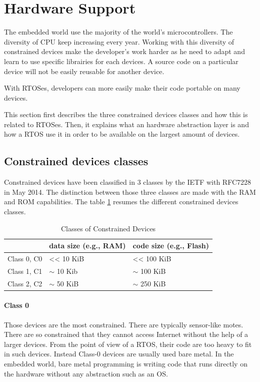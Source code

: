 \section{Hardware Support}

The embedded world use the majority of the world's microcontrollers.
The diversity of CPU keep increasing every year.
Working with this diversity of constrained devices make the developer's work harder as he need to adapt and learn to use specific librairies for each devices.
A source code on a particular device will not be easily reusable for another device.

With RTOSes, developers can more easily make their code portable on many devices.

This section first describes the three constrained devices classes and how this is related to RTOSes.
Then, it explains what an hardware abstraction layer is and how a RTOS use it in order to be available on the largest amount of devices.

\subsection{Constrained devices classes}

Constrained devices have been classified in 3 classes by the IETF with RFC7228 in May 2014. The distinction between those three classes are made with the RAM and ROM capabilities.
The table \ref{tab:constrained-devices-classes} resumes the different constrained devices classes.

\begin{table}[!h]
  \centering
  \begin{tabular}{|l|l|l|}
  \hline
   & data size (e.g., RAM) & code size (e.g., Flash) \\ \hline
  Class 0, C0 & \textless{}\textless{} 10 KiB & \textless{}\textless{} 100 KiB \\ %
  Class 1, C1 & $\sim$ 10 Kib & $\sim$ 100 KiB \\ %
  Class 2, C2 & $\sim$ 50 KiB & $\sim$ 250 KiB \\ \hline
  \end{tabular}
  \caption{Classes of Constrained Devices}
  \label{tab:constrained-devices-classes}
\end{table}

\paragraph{Class 0}
Those devices are the most constrained.
There are typically sensor-like motes.
There are so constrained that they cannot access Internet without the help of a larger devices.
From the point of view of a RTOS, their code are too heavy to fit in such devices.
Instead Class-0 devices are usually used bare metal.
In the embedded world, bare metal programming is writing code that runs directly on the hardware without any abstraction such as an OS.


